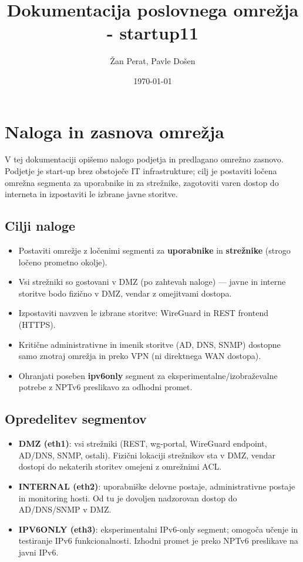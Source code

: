 \documentclass[a4paper,11pt]{article}
\title{Dokumentacija poslovnega omrežja - startup11}
\author{Žan Perat, Pavle Došen}
\date{\today}
\begin{document}
\maketitle
\newpage
\tableofcontents
\newpage

\section{Naloga in zasnova omrežja}
V tej dokumentaciji opišemo nalogo podjetja in predlagano omrežno zasnovo. Podjetje je start-up brez obstoječe IT infrastrukture; cilj je postaviti ločena omrežna segmenta za uporabnike in za strežnike, zagotoviti varen dostop do interneta in izpostaviti le izbrane javne storitve.

\subsection{Cilji naloge}
\begin{itemize}
  \item Postaviti omrežje z ločenimi segmenti za \textbf{uporabnike} in \textbf{strežnike} (strogo ločeno prometno okolje).
  \item Vsi strežniki so gostovani v DMZ (po zahtevah naloge) — javne in interne storitve bodo fizično v DMZ, vendar z omejitvami dostopa.
  \item Izpostaviti navzven le izbrane storitve: WireGuard in REST frontend (HTTPS).
  \item Kritične administrativne in imenik storitve (AD, DNS, SNMP) dostopne samo znotraj omrežja in preko VPN (ni direktnega WAN dostopa).
  \item Ohranjati poseben \textbf{ipv6only} segment za eksperimentalne/izobraževalne potrebe z NPTv6 preslikavo za odhodni promet.
\end{itemize}

\subsection{Opredelitev segmentov}
\begin{itemize}
  \item \textbf{DMZ (eth1)}: vsi strežniki (REST, wg-portal, WireGuard endpoint, AD/DNS, SNMP, ostali). Fizični lokaciji strežnikov sta v DMZ, vendar dostopi do nekaterih storitev omejeni z omrežnimi ACL.
  \item \textbf{INTERNAL (eth2)}: uporabniške delovne postaje, administrativne postaje in monitoring hosti. Od tu je dovoljen nadzorovan dostop do AD/DNS/SNMP v DMZ.
  \item \textbf{IPV6ONLY (eth3)}: eksperimentalni IPv6-only segment; omogoča učenje in testiranje IPv6 funkcionalnosti. Izhodni promet je preko NPTv6 preslikave na javni IPv6.
\end{itemize}
\end{document}
